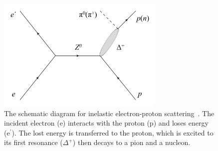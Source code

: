 %
%
%

\begin{singlespace}
\begin{figure}[h]
	\begin{center}
	\includegraphics[width=8.0cm]{figures/FeynmanDiagramsPVN2Delta}
	\end{center}
	\caption
	{The schematic diagram for inelastic electron-proton scattering~\cite{leacock_qweak}. The incident electron (e) interacts with the proton (p) and loses energy (e$^{\prime}$). The lost energy is transferred to the proton, which is excited to its first resonance ($\Delta^{+}$) then decays to a pion and a nucleon.}
	\label{fig:FeynmanDiagramsPVN2Delta}
\end{figure}
\end{singlespace}


